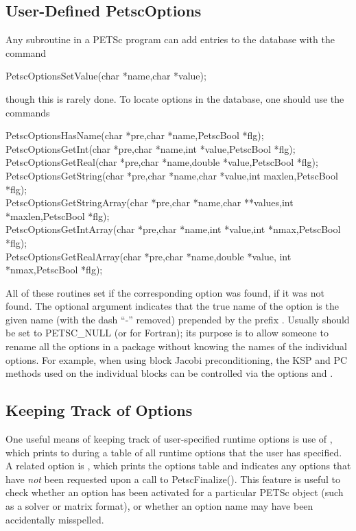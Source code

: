 {{{\subsection{User-Defined PetscOptions}

Any subroutine in a PETSc program can add entries to the database with the
command
\begin{tabbing}
  PetscOptionsSetValue(char *name,char *value);
\end{tabbing}
though this is rarely done.
To locate options in the database, one should use the
commands
\begin{tabbing}
  PetscOptionsHasName(char *pre,char *name,PetscBool  *flg);\\
  PetscOptionsGetInt(char *pre,char *name,int *value,PetscBool  *flg);\\
  PetscOptionsGetReal(char *pre,char *name,double *value,PetscBool  *flg);\\
  PetscOptionsGetString(char *pre,char *name,char *value,int maxlen,PetscBool  *flg);\\
  PetscOptionsGetStringArray(char *pre,char *name,char **values,int *maxlen,PetscBool  *flg);\\
  PetscOptionsGetIntArray(char *pre,char *name,int *value,int *nmax,PetscBool  *flg);\\
  PetscOptionsGetRealArray(char *pre,char *name,double *value, int *nmax,PetscBool  *flg);
\end{tabbing}
All of
these
routines set  if the corresponding option was found,  if it
was not found.  The optional argument
 indicates that the true name of the option is the given name
(with the dash ``-'' removed) prepended by the prefix .
Usually  should be set to PETSC\_NULL (or 
for Fortran); its purpose is to
allow someone to rename all the options in a package without knowing
the names of the individual options.  For example, when using block
Jacobi preconditioning, the KSP and PC methods used on the individual
blocks can be controlled via the options  and . 

\subsection{Keeping Track of Options}

One useful means of keeping track of user-specified runtime options is
use of , which prints to  during  a table of all runtime options that the user has
specified.   A related option is ,
 which prints the options table and indicates
any options that have {\em not} been requested upon a call to PetscFinalize().  This feature is useful to check whether an option
has been activated for a particular PETSc object (such as a solver or
matrix format), or whether an option name may have been accidentally
misspelled.

}}}
